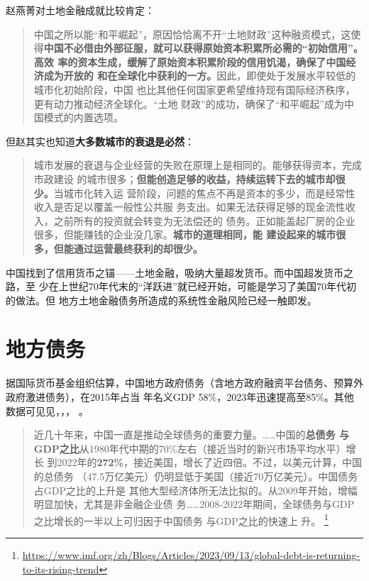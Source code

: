 赵燕菁对土地金融成就比较肯定：
\begin{quotation}
  中国之所以能“和平崛起”，原因恰恰离不开“土地财政”这种融资模式，这使
  得\textbf{中国不必借由外部征服，就可以获得原始资本积累所必需的“初始信用”。高效
    率的资本生成，缓解了原始资本积累阶段的信用饥渴，确保了中国经济成为开放的
    和在全球化中获利的一方。}因此，即使处于发展水平较低的城市化初始阶段，中国
  也比其他任何国家更希望维持现有国际经济秩序，更有动力推动经济全球化。“土地
  财政”的成功，确保了“和平崛起”成为中国模式的内置选项。
\end{quotation}

但赵其实也知道\textbf{大多数城市的衰退是必然}：
\begin{quotation}
  城市发展的衰退与企业经营的失败在原理上是相同的。能够获得资本，完成市政建设
  的城市很多；\textbf{但能创造足够的收益，持续运转下去的城市却很少。}当城市化转入运
  营阶段，问题的焦点不再是资本的多少，而是经常性收入是否足以覆盖一般性公共服
  务支出。如果无法获得足够的现金流性收入，之前所有的投资就会转变为无法偿还的
  债务。正如能盖起厂房的企业很多，但能赚钱的企业没几家。\textbf{城市的道理相同，能
    建设起来的城市很多，但能通过运营最终获利的却很少。}
\end{quotation}

中国找到了信用货币之锚——土地金融，吸纳大量超发货币。而中国超发货币之路，至
少在上世纪70年代末的“洋跃进”就已经开始，可能是学习了美国70年代初的做法。但
地方土地金融债务所造成的系统性金融风险已经一触即发。



\section{地方债务}




据国际货币基金组织估算，中国地方政府债务（含地方政府融资平台债务、预算外政府激进债务），在2015年占当
年名义GDP 58\%，2023年迅速提高至85\%。其他数据可见见，，，
。

\begin{quotation}
  近几十年来，中国一直是推动全球债务的重要力量。……中国的\textbf{总债务
    与GDP之比}从1980年代中期的70\%左右（接近当时的新兴市场平均水平）增长
  到2022年的\textbf{272\%}，接近美国，增长了近四倍。不过，以美元计算，中国的总债务
  （47.5万亿美元）仍明显低于美国（接近70万亿美元）。中国债务占GDP之比的上升是
  其他大型经济体所无法比拟的。从2009年开始，增幅明显加快，尤其是非金融企业债
  务……2008-2022年期间，全球债务与GDP之比增长的一半以上可归因于中国债务
  与GDP之比的快速上
  升。
  \footnote{\url{https://www.imf.org/zh/Blogs/Articles/2023/09/13/global-debt-is-returning-to-its-rising-trend}}
\end{quotation}

